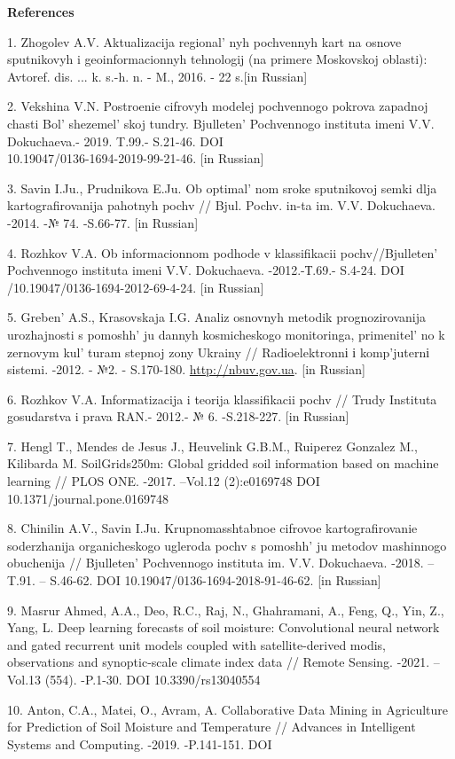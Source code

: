 \begin{center}
{\bfseries References}
\end{center}

\begin{references}
1. Zhogolev A.V. Aktualizacija regional' nyh pochvennyh
kart na osnove sputnikovyh i geoinformacionnyh tehnologij (na primere
Moskovskoj oblasti): Avtoref. dis. ... k. s.-h. n. - M., 2016. - 22
s.{[}in Russian{]}

2. Vekshina V.N. Postroenie cifrovyh modelej pochvennogo pokrova zapadnoj
chasti Bol' shezemel' skoj tundry.
Bjulleten'{} Pochvennogo instituta imeni V.V.
Dokuchaeva.- 2019. T.99.- S.21-46. DOI \\10.19047/0136-1694-2019-99-21-46.
{[}in Russian{]}

3. Savin I.Ju., Prudnikova E.Ju. Ob optimal' nom sroke
sputnikovoj semki dlja kartografirovanija pahotnyh pochv // Bjul. Pochv.
in-ta im. V.V. Dokuchaeva. -2014. -№ 74. -S.66-77. {[}in Russian{]}

4. Rozhkov V.A. Ob informacionnom podhode v klassifikacii
pochv//Bjulleten'{} Pochvennogo instituta imeni V.V.
Dokuchaeva. -2012.-Т.69.- S.4-24. DOI /10.19047/0136-1694-2012-69-4-24.
{[}in Russian{]}

5. Greben'{} A.S., Krasovskaja I.G. Analiz osnovnyh
metodik prognozirovanija urozhajnosti s pomoshh' ju
dannyh kosmicheskogo monitoringa, primenitel' no k
zernovym kul' turam stepnoj zony Ukrainy //
Radіoelektronnі і komp'juternі sistemi. -2012. - №2. - S.170-180.
\href{http://www.irbis-nbuv.gov.ua/cgi-bin/irbis_nbuv/cgiirbis_64.exe?I21DBN=LINK&P21DBN=UJRN&Z21ID=&S21REF=10&S21CNR=20&S21STN=1&S21FMT=ASP_meta&C21COM=S&2_S21P03=FILA=&2_S21STR=recs_2012_2_27}{http://nbuv.gov.ua}. {[}in Russian{]}

6. Rozhkov V.A. Informatizacija i teorija klassifikacii pochv // Trudy
Instituta gosudarstva i prava RAN.- 2012.- № 6. -S.218-227. {[}in
Russian{]}

7. Hengl T., Mendes de Jesus J., Heuvelink G.B.M., Ruiperez Gonzalez M.,
Kilibarda M. SoilGrids250m: Global gridded soil information based on
machine learning // PLOS ONE. -2017. --Vol.12 (2):e0169748 DOI
10.1371/journal.pone.0169748

8. Chinilin A.V., Savin I.Ju. Krupnomasshtabnoe cifrovoe
kartografirovanie soderzhanija organicheskogo ugleroda pochv s
pomoshh' ju metodov mashinnogo obuchenija //
Bjulleten'{} Pochvennogo instituta im. V.V. Dokuchaeva.
-2018. --T.91. -- S.46-62. DOI 10.19047/0136-1694-2018-91-46-62. {[}in
Russian{]}

9. Masrur Ahmed, A.A., Deo, R.C., Raj, N., Ghahramani, A., Feng, Q., Yin,
Z., Yang, L. Deep learning forecasts of soil moisture: Convolutional
neural network and gated recurrent unit models coupled with
satellite-derived modis, observations and synoptic-scale climate index
data // Remote Sensing. -2021. --Vol.13 (554). -P.1-30. DOI
10.3390/rs13040554

10. Anton, C.A., Matei, O., Avram, A. Collaborative Data Mining in
Agriculture for Prediction of Soil Moisture and Temperature // Advances
in Intelligent Systems and Computing. -2019. -P.141-151. DOI
\end{references}

